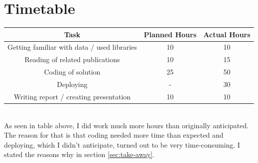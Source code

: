 \documentclass[11pt]{article}
\begin{document}
\section{Timetable}

\begin{tabular}{|c|c|c|}
	\hline 
	\textbf{Task} & \textbf{Planned Hours}  &  \textbf{Actual Hours} \\ 
	\hline 
	 Getting familiar with data / used libraries	& 10 & 10 \\ 
	\hline 
	Reading of related publications & 10 &  15 \\ 
	\hline 
	Coding of solution & 25 & 50 \\ 
	\hline 
	Deploying & - & 30 \\ 
	\hline 
	Writing report / creating presentation & 10 & 10 \\ 
	\hline 
\end{tabular}
\\

As seen in table above, I did work much more hours than originally anticipated. The reason for that is that coding needed more time than expected and deploying, which I didn't anticipate, turned out to be very time-consuming. I stated the reasons why in section \ref{sec:take-away}.

\printbibliography
\end{document}
